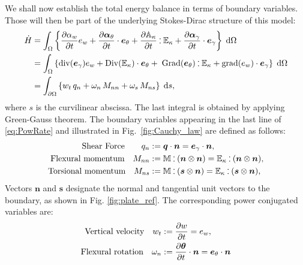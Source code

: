 \documentclass[11t]{article}
\def\onedot{$\mathsurround0pt\ldotp$}
\def\cddot{%
	\mathbin{\vcenter{\baselineskip.67ex
			\hbox{\onedot}\hbox{\onedot}}%
}}
\begin{document}
	{
		We shall now establish the total energy balance in terms of boundary variables. Those will then be part of the underlying Stokes-Dirac structure of this model:
		\begin{equation}
		\label{eq:PowRate}
		\begin{aligned}
		\dot{H}&= \int_{\Omega} \left\{ \diffp{\alpha_w}{t} e_w  + \diffp{\bm\alpha_\theta}{t} \cdot \bm{e}_\theta + \diffp{\mathbb{A}_{\kappa}}{t} \cddot \mathbb{E}_{\kappa}  + \diffp{\bm\alpha_{\gamma}}{t} \cdot \bm{e}_{\gamma} \right\} \d\Omega\\
		&= \int_{\Omega} \left\{ \mathrm{div}(\bm{e}_{\gamma}) e_w  + \mathrm{Div}(\mathbb{E}_{\kappa}) \cdot \bm{e}_\theta + \; \mathrm{Grad}(\bm{e}_{\theta}) \cddot \mathbb{E}_{\kappa}  + \mathrm{grad} (e_w) \cdot \bm{e}_{\gamma} \right\} \d\Omega \\
		&= \int_{\partial \Omega} \left\{ w_t \, q_n  + \omega_n \, M_{nn} + \omega_s \, M_{ns} \right\} \d{s},  \\
		\end{aligned}
		\end{equation}
		where $s$ is the curvilinear abscissa. The last integral is obtained by applying Green-Gauss theorem. The boundary variables appearing in the last line of \eqref{eq:PowRate} and illustrated in Fig.~\ref{fig:Cauchy_law} are defined as follows:
		\begin{equation}
		\label{eq:QnMnnMns}
		\begin{aligned}
		\text{Shear Force}  \qquad q_{n} &:= \bm{q} \cdot \bm{n}=  \bm{e}_{\gamma} \cdot \bm{n},  \\
		\text{Flexural momentum} \quad 
		M_{nn} &:=  \mathbb{M} \cddot (\bm{n}\otimes{\bm{n}}) = \mathbb{E}_{\kappa} \cddot (\bm{n}\otimes{\bm{n}}) 	\\
		\text{Torsional momentum} \quad M_{ns} &:= \mathbb{M} \cddot (\bm{s}\otimes{\bm{n}}) = \mathbb{E}_{\kappa} \cddot (\bm{s}\otimes{\bm{n}}),	
		\end{aligned},
		\end{equation}
		Vectors $\bm{n}$ and $\bm{s}$ designate the normal and tangential unit vectors to the boundary, as shown in Fig. \ref{fig:plate_ref}. The corresponding power conjugated variables are:
		\begin{equation}
		\label{eq:wtwnws}
		\begin{aligned}
		\text{Vertical velocity}  \quad w_t &:= \diffp{w}{t} = e_w, \\
		\text{Flexural rotation} \quad 
		\omega_{n} &:= \diffp{\bm{\theta}}{t} \cdot \bm{n} = \bm{e}_\theta \cdot \bm{n} \\

\end{aligned}
\end{equation}}
\end{document}
